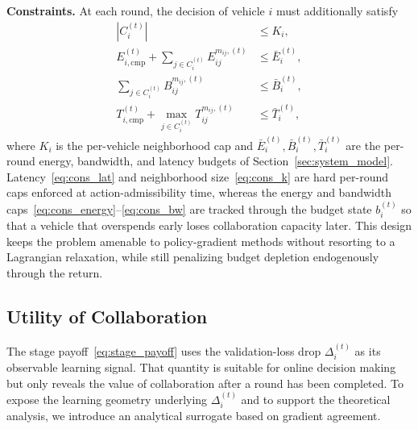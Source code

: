 \noindent\textbf{Constraints.} At each round, the decision of vehicle $i$ must additionally satisfy
\begin{align}
\label{eq:cons_k}
    |C_i^{(t)}| &\le K_i,\\
\label{eq:cons_energy}
    E_{i,\mathrm{cmp}}^{(t)}+\sum_{j\in C_i^{(t)}} E_{ij}^{m_{ij},(t)} &\le \bar E_i^{(t)},\\
\label{eq:cons_bw}
    \sum_{j\in C_i^{(t)}} B_{ij}^{m_{ij},(t)} &\le \bar B_i^{(t)},\\
\label{eq:cons_lat}
    T_{i,\mathrm{cmp}}^{(t)}+\max_{j\in C_i^{(t)}} T_{ij}^{m_{ij},(t)} &\le \bar T_i^{(t)},
\end{align}
where $K_i$ is the per-vehicle neighborhood cap and $\bar E_i^{(t)},\bar B_i^{(t)},\bar T_i^{(t)}$ are the per-round energy, bandwidth, and latency budgets of Section~\ref{sec:system_model}. Latency~\eqref{eq:cons_lat} and neighborhood size~\eqref{eq:cons_k} are hard per-round caps enforced at action-admissibility time, whereas the energy and bandwidth caps~\eqref{eq:cons_energy}--\eqref{eq:cons_bw} are tracked through the budget state $b_i^{(t)}$ so that a vehicle that overspends early loses collaboration capacity later. This design keeps the problem amenable to policy-gradient methods without resorting to a Lagrangian relaxation, while still penalizing budget depletion endogenously through the return.

\subsection{Utility of Collaboration}
\label{subsec:utility}

The stage payoff~\eqref{eq:stage_payoff} uses the validation-loss drop $\Delta_i^{(t)}$ as its observable learning signal. That quantity is suitable for online decision making but only reveals the value of collaboration after a round has been completed. To expose the learning geometry underlying $\Delta_i^{(t)}$ and to support the theoretical analysis, we introduce an analytical surrogate based on gradient agreement.

